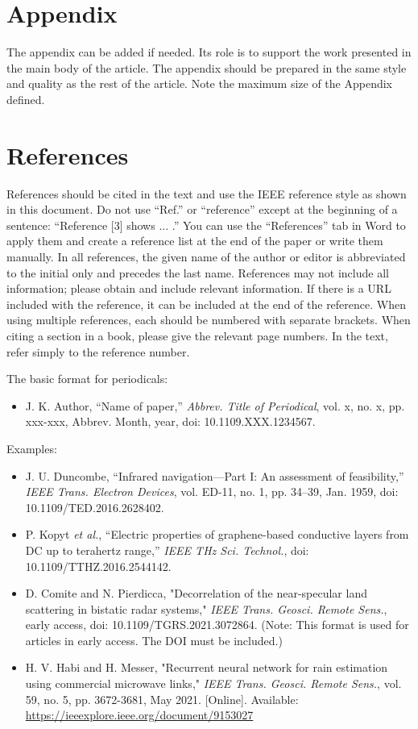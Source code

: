\documentclass[11pt,a4paper]{article}
\begin{document}
\chapter{Appendix}
The appendix can be added if needed. Its role is to support the work presented in the main body of the article. The appendix should be prepared in the same style and quality as the rest of the article. Note the maximum size of the Appendix defined.

\chapter{References}
References should be cited in the text and use the IEEE reference style as shown in this document. Do not use “Ref.” or “reference” except at the beginning of a sentence: “Reference [3] shows ... .” You can use the “References” tab in Word to apply them and create a reference list at the end of the paper or write them manually. In all references, the given name of the author or editor is abbreviated to the initial only and precedes the last name. References may not include all information; please obtain and include relevant information. If there is a URL included with the reference, it can be included at the end of the reference. When using multiple references, each should be numbered with separate brackets. When citing a section in a book, please give the relevant page numbers. In the text, refer simply to the reference number.

The basic format for periodicals:
\begin{itemize}
    \item J. K. Author, “Name of paper,” \textit{Abbrev. Title of Periodical}, vol. x, no. x, pp. xxx-xxx, Abbrev. Month, year, doi: 10.1109.XXX.1234567.
\end{itemize}
Examples:
\begin{itemize}
    \item J. U. Duncombe, “Infrared navigation—Part I: An assessment of feasibility,” \textit{IEEE Trans. Electron Devices}, vol. ED-11, no. 1, pp. 34–39, Jan. 1959, doi: 10.1109/TED.2016.2628402.
    \item P. Kopyt \textit{et al.}, “Electric properties of graphene-based conductive layers from DC up to terahertz range,” \textit{IEEE THz Sci. Technol.}, doi: 10.1109/TTHZ.2016.2544142.
    \item D. Comite and N. Pierdicca, "Decorrelation of the near-specular land scattering in bistatic radar systems," \textit{IEEE Trans. Geosci. Remote Sens.}, early access, doi: 10.1109/TGRS.2021.3072864. (Note: This format is used for articles in early access. The DOI must be included.)
    \item H. V. Habi and H. Messer, "Recurrent neural network for rain estimation using commercial microwave links," \textit{IEEE Trans. Geosci. Remote Sens.}, vol. 59, no. 5, pp. 3672-3681, May 2021. [Online]. Available: \url{https://ieeexplore.ieee.org/document/9153027}
\end{itemize}
\end{document}
